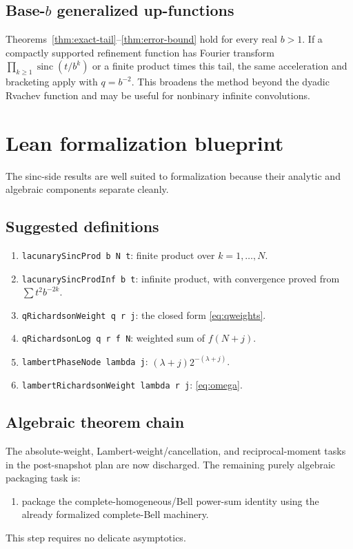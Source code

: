 \documentclass[11pt]{article}
\theoremstyle{definition}
\theoremstyle{remark}
\newcommand{\sinc}{\operatorname{sinc}}
\begin{document}
\subsection{Base-\texorpdfstring{$b$}{b} generalized up-functions}

Theorems~\ref{thm:exact-tail}--\ref{thm:error-bound} hold for every real $b>1$. If a compactly supported refinement function has Fourier transform
\(
\prod_{k\ge1}\sinc(t/b^k)
\)
or a finite product times this tail, the same acceleration and bracketing apply with $q=b^{-2}$. This broadens the method beyond the dyadic Rvachev function and may be useful for nonbinary infinite convolutions.

\section{Lean formalization blueprint}
\label{sec:lean}

The sinc-side results are well suited to formalization because their analytic and algebraic components separate cleanly.

\subsection{Suggested definitions}

\begin{enumerate}
\item \texttt{lacunarySincProd b N t}: finite product over $k=1,\ldots,N$.
\item \texttt{lacunarySincProdInf b t}: infinite product, with convergence proved from $\sum t^2b^{-2k}$.
\item \texttt{qRichardsonWeight q r j}: the closed form \cref{eq:qweights}.
\item \texttt{qRichardsonLog q r f N}: weighted sum of $f(N+j)$.
\item \texttt{lambertPhaseNode lambda j}: $(\lambda+j)2^{-(\lambda+j)}$.
\item \texttt{lambertRichardsonWeight lambda r j}: \cref{eq:omega}.
\end{enumerate}

\subsection{Algebraic theorem chain}

The absolute-weight, Lambert-weight/cancellation, and reciprocal-moment tasks
in the post-snapshot plan are now discharged.  The remaining purely algebraic
packaging task is:
\begin{enumerate}
\item package the complete-homogeneous/Bell power-sum identity using the
      already formalized complete-Bell machinery.
\end{enumerate}
This step requires no delicate asymptotics.
\end{document}
